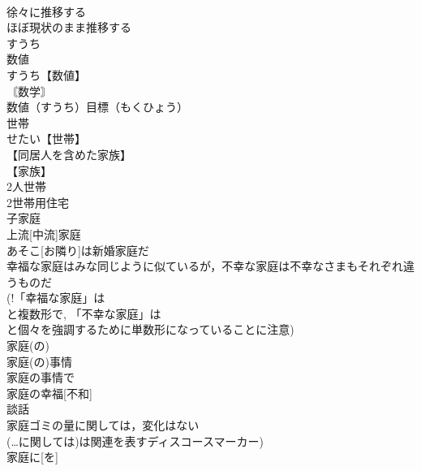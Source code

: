\documentclass[8pt]{extreport}
\begin{document}
\begin{CJK}{UTF8}{min}
\\	徐々に推移する
\\	ほぼ現状のまま推移する
\\	すうち
\\	数値		
\\	すうち【数値】
\\	〘数学〙
\\	数値（すうち）目標（もくひょう）
\\	世帯		
\\	せたい【世帯】
\\	【同居人を含めた家族】
\\	【家族】
\\	2人世帯
\\	2世帯用住宅
\\	[｟米｠ 
\\	世帯数
\\	世帯主
\\	かてい【家庭】名詞
\\	〖所帯〗
\\	使い分け
\\	家族とともに暮らす場としての家をさす
\\	暖かい家庭的雰囲気を含意する.
\\	社会単位としての家族をさす
\\	使用人や下宿人なども含む，所帯の全員をさす
\\	~家庭
\\	楽しい家庭
\\	裕福な家庭
\\	崩壊家庭
\\	母[父]子家庭
\\	上流[中流]家庭
\\	あそこ[お隣り]は新婚家庭だ
\\	幸福な家庭はみな同じように似ているが，不幸な家庭は不幸なさまもそれぞれ違うものだ
\\	(!「幸福な家庭」は 
\\	と複数形で, 「不幸な家庭」は 
\\	と個々を強調するために単数形になっていることに注意)
\\	家庭(の)~
\\	家庭(の)事情
\\	家庭の事情で
\\	家庭の幸福[不和]
\\	談話
\\	家庭ゴミの量に関しては，変化はない
\\	(…に関しては)は関連を表すディスコースマーカー)
\\	家庭に[を]

\end{CJK}
\end{document}
